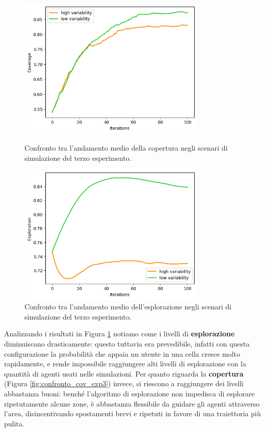 \begin{figure}[p]
    \centering
    \includegraphics[width=0.8\textwidth]{img/ch4/experiment3/coverages_graphic_comparison.png}
    \caption[Grafici di copertura nel terzo esperimento]{Confronto tra l'andamento medio della copertura negli scenari di simulazione del terzo esperimento.}
    \label{fig:confronto_cov_exp3}

\vspace*{0.5cm}

    \includegraphics[width=0.8\textwidth]{img/ch4/experiment3/exploration_graphic_comparison.png}
    \caption[Grafici di esplorazione nel terzo esperimento]{Confronto tra l'andamento medio dell'esplorazione negli scenari di simulazione del terzo esperimento.}
    \label{fig:confronto_expl_exp3}
\end{figure}

Analizzando i risultati in Figura \ref{fig:confronto_expl_exp3} notiamo come i livelli di \textbf{esplorazione} diminuiscano drasticamente: questo tuttavia era prevedibile, infatti con questa configurazione la probabilità che appaia un utente in una cella cresce molto rapidamente, e rende impossibile raggiungere alti livelli di esplorazione con la quantità di agenti usati nelle simulazioni.
Per quanto riguarda la \textbf{copertura} (Figura \ref{fig:confronto_cov_exp3}) invece, si riescono a raggiungere dei livelli abbastanza buoni: benché l'algoritmo di esplorazione non impedisca di esplorare ripetutamente alcune zone, è abbastanza flessibile da guidare gli agenti attraverso l'area, disincentivando spostamenti brevi e ripetuti in favore di una traiettoria più pulita.

